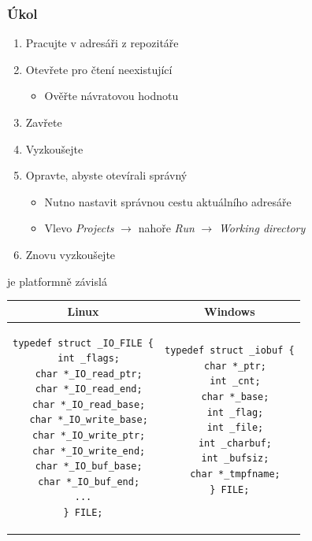\begin{frame}
  \frametitle{Úkol}

  \begin{enumerate}
    \item Pracujte v adresáři \ifpcdirlinux {} \else {} \fi z
      repozitáře
    \item Otevřete pro čtení neexistující 
    \begin{itemize}
      \item Ověřte návratovou hodnotu
    \end{itemize}

    \item Zavřete
    \item Vyzkoušejte
    \item Opravte, abyste otevírali správný 
    \begin{itemize}
      \item Nutno nastavit správnou cestu aktuálního adresáře
      \item Vlevo \textit{Projects} $\rightarrow$ nahoře \textit{Run}
        $\rightarrow$ \textit{Working directory}
    \end{itemize}

    \item Znovu vyzkoušejte
  \end{enumerate}

\end{frame}

\begin{frame}[fragile]{ je platformně závislá}

  \begin{center}
  \begin{tabular}{|c|c|} \hline
  Linux & Windows \\ \hline
  \begin{lstlisting}
typedef struct _IO_FILE {
  int _flags;
  char *_IO_read_ptr;
  char *_IO_read_end;
  char *_IO_read_base;
  char *_IO_write_base;
  char *_IO_write_ptr;
  char *_IO_write_end;
  char *_IO_buf_base;
  char *_IO_buf_end;
...
} FILE;
  \end{lstlisting} &
  \begin{lstlisting}[showlines]
typedef struct _iobuf {
  char *_ptr;
  int _cnt;
  char *_base;
  int _flag;
  int _file;
  int _charbuf;
  int _bufsiz;
  char *_tmpfname;
} FILE;


  \end{lstlisting} \\ \hline
  \end{tabular}

  \bigskip
  \bigskip
  \pause

  \end{center}

\end{frame}

